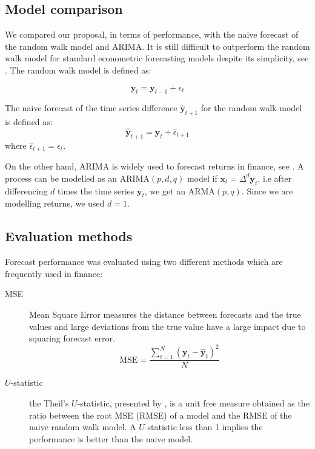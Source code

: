 \subsection{Model comparison}
We compared our proposal, in terms of performance, with the naive forecast of
the random walk model and ARIMA. It is still difficult to outperform the random
walk model for standard econometric forecasting models  despite its
simplicity, see \cite{lo2011}. The random walk model is defined as:

\begin{equation}
\mathbf{y}_t = \mathbf{y}_{t-1} + \epsilon_{t}
\label{rwmodel}
\end{equation}

The naive forecast of the time series difference $\hat{\mathbf{y}}_{t+1}$ for
the random walk model is defined as:
\begin{equation}
\hat{\mathbf{y}}_{t+1} = \mathbf{y}_t + \hat{\epsilon}_{t+1} 
\end{equation}
\noindent where  $\hat{\epsilon}_{t+1} = \epsilon_{t}$.

On the other hand, ARIMA is widely used to forecast returns in finance, see
\cite{tsay2005}. A process can be modelled as an ARIMA$(p,d,q)$ model if
$\mathbf{x}_t=\Delta^d \mathbf{y}_t $, i.e after differencing $d$ times the time
series $\mathbf{y}_t$,  we get an ARMA$(p,q)$. Since we are modelling returns,
we used $d=1$.


\subsection{Evaluation methods}

Forecast performance was evaluated using two different methods which are
frequently used in finance:
\begin{description}
\item[MSE]  Mean Square Error measures the distance between forecasts
and the true values and large deviations from the true value have a
large impact due to squaring forecast error.
\begin{equation}\label{eq:MSE}
\text{MSE} = 
\frac{\displaystyle \sum_{t=1}^{N} (\mathbf{y}_t-\hat{\mathbf{y}}_t)^2}{N}
\end{equation}
\item[$U$-statistic] the Theil's $U$-statistic, presented by
\cite{theil1966}, is a unit free measure obtained as the ratio between the root
MSE (RMSE) of a model and the RMSE of the naive random walk model. A
$U$-statistic less than 1 implies the performance is better than the naive
model.
\end{description}


